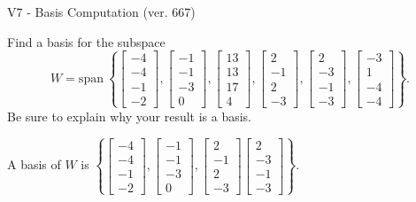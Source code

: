 \begin{exercise}
  \begin{exerciseTitle}V7 - Basis Computation (ver. 667)\end{exerciseTitle}
  \begin{exerciseStatement}
    Find a basis for the subspace 
\[W=\mathrm{span}\ \left\{\left[\begin{array}{r}
-4 \\
-4 \\
-1 \\
-2
\end{array}\right] , \left[\begin{array}{r}
-1 \\
-1 \\
-3 \\
0
\end{array}\right] , \left[\begin{array}{r}
13 \\
13 \\
17 \\
4
\end{array}\right] , \left[\begin{array}{r}
2 \\
-1 \\
2 \\
-3
\end{array}\right] , \left[\begin{array}{r}
2 \\
-3 \\
-1 \\
-3
\end{array}\right] , \left[\begin{array}{r}
-3 \\
1 \\
-4 \\
-4
\end{array}\right]\right\}.\]
 Be sure to explain why your result is a basis.


  \end{exerciseStatement}
  \begin{exerciseAnswer}
   A basis of \(W\) is  \(\left\{\left[\begin{array}{r}
-4 \\
-4 \\
-1 \\
-2
\end{array}\right] , \left[\begin{array}{r}
-1 \\
-1 \\
-3 \\
0
\end{array}\right] , \left[\begin{array}{r}
2 \\
-1 \\
2 \\
-3
\end{array}\right] \left[\begin{array}{r}
2 \\
-3 \\
-1 \\
-3
\end{array}\right]\right\}\).
  


  \end{exerciseAnswer}
\end{exercise}